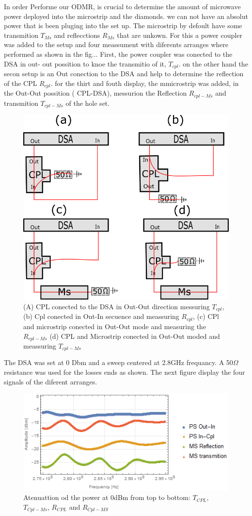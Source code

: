 In order Performe our ODMR, is crucial to determine the amount of microwave power deployed into the microstrip and the diamonds. we can not have an absolut power that is been pluging into the set up. The microstrip by defoult have some transmition $T_{Ms}$ and reflecctions $R_{Ms}$ that are unkown.
For this a power coupler was added to the setup and four meassument with diferents arranges where performed as shown in the fig...
First, the power coupler was conected to the DSA in out- out possition to knoe the transmitio of it, $T_{cpl}$. on the other hand the secon setup is an Out conection to the DSA and help to determine the reflection of the CPL $R_{cpl}$. for the thirt and fouth display, the mmicrostrip was added, in the Out-Out possition ( CPL-DSA), messurion the Reflection $R_{cpl-Ms}$ and transmition $T_{cpl-Ms}$ of the hole set.

\begin{figure}
	\centering
	\includegraphics[width=0.7\linewidth]{../figures/APD}
	\caption[diferent arranges of the CPL and MicroStrip conected to the DSA]{(A) CPL conected to the DSA in Out-Out direction messuring $T_{cpl}$, (b) Cpl conected in Out-In secuence and meassuring $R_{cpl}$, (c) CPl and microstrip conected in Out-Out mode and measuring the $R_{cpl-Ms}$ (d) CPL and Microstrip conected in Out-Out moded and meassuring $T_{cpl-Ms}$}
	\label{fig:apd}
\end{figure}

The DSA was set at 0 Dbm and a sweep centered at 2.8GHz frequancy. A 50$\Omega$ resistance was used for the losses ends as shown. The next figure display the four signals of the diferent arranges.
\begin{figure}
	\centering
	\includegraphics[width=0.7\linewidth]{../figures/microstrip}
	\caption{Atenuattion od the power at 0dBm from top to bottom: $T_{CPL}$,$T_{Cpl-Ms}$, $R_{CPL}$ and $R_{Cpl-MS}$}
	\label{fig:microstrip}
	\end{figure}

